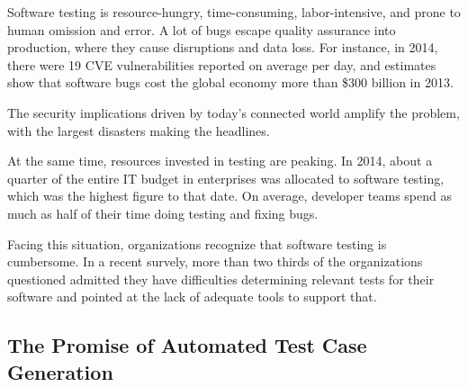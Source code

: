 
Software testing is resource-hungry, time-consuming, labor-intensive, and prone to human omission and error.  A lot of bugs escape quality assurance into production, where they cause disruptions and data loss. For instance, in 2014, there were 19 CVE vulnerabilities reported on average per day, and estimates show that software bugs cost the global economy more than \$300 billion in 2013.

The security implications driven by today's connected world amplify the problem, with the largest disasters making the headlines.

At the same time, resources invested in testing are peaking. In 2014, about a quarter of the entire IT budget in enterprises was allocated to software testing, which was the highest figure to that date.  On average, developer teams spend as much as half of their time doing testing and fixing bugs.

Facing this situation, organizations recognize that software testing is cumbersome.  In a recent survely, more than two thirds of the organizations questioned admitted they have difficulties determining relevant tests for their software and pointed at the lack of adequate tools to support that.

\subsection{The Promise of Automated Test Case Generation}



